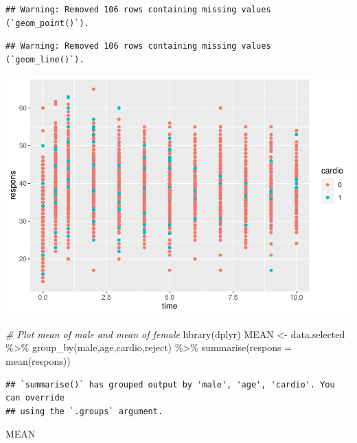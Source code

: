 \documentclass[
]{article}
\newenvironment{Shaded}{\begin{snugshade}}{\end{snugshade}}
\newcommand{\AttributeTok}[1]{\textcolor[rgb]{0.77,0.63,0.00}{#1}}
\newcommand{\CommentTok}[1]{\textcolor[rgb]{0.56,0.35,0.01}{\textit{#1}}}
\newcommand{\FunctionTok}[1]{\textcolor[rgb]{0.00,0.00,0.00}{#1}}
\newcommand{\NormalTok}[1]{#1}
\newcommand{\OtherTok}[1]{\textcolor[rgb]{0.56,0.35,0.01}{#1}}
\newcommand{\SpecialCharTok}[1]{\textcolor[rgb]{0.00,0.00,0.00}{#1}}
\begin{document}
\begin{verbatim}
## Warning: Removed 106 rows containing missing values (`geom_point()`).
\end{verbatim}

\begin{verbatim}
## Warning: Removed 106 rows containing missing values (`geom_line()`).
\end{verbatim}

\includegraphics{LDA_Wan_files/figure-latex/unnamed-chunk-12-1.pdf}

\begin{Shaded}
\begin{Highlighting}[]
\CommentTok{\# Plot mean of male and mean of female}
\FunctionTok{library}\NormalTok{(dplyr)}
\NormalTok{MEAN }\OtherTok{\textless{}{-}}\NormalTok{ data.selected }\SpecialCharTok{\%\textgreater{}\%}
  \FunctionTok{group\_by}\NormalTok{(male,age,cardio,reject) }\SpecialCharTok{\%\textgreater{}\%}
  \FunctionTok{summarise}\NormalTok{(}\AttributeTok{respons =} \FunctionTok{mean}\NormalTok{(respons))}
\end{Highlighting}
\end{Shaded}

\begin{verbatim}
## `summarise()` has grouped output by 'male', 'age', 'cardio'. You can override
## using the `.groups` argument.
\end{verbatim}

\begin{Shaded}
\begin{Highlighting}[]
\NormalTok{MEAN}
\end{Highlighting}
\end{Shaded}
\end{document}
